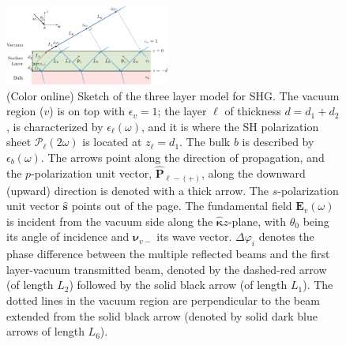 \documentclass[aps,prb,10pt,showpacs,letterpaper,twocolumn]{revtex4-1}
\begin{document}
\begin{figure}[t]
\centering 
\includegraphics[width=0.48\textwidth]{fig1}
\caption{(Color online) Sketch of the three layer model for SHG. The vacuum
region ($v$) is on top with $\epsilon_{v}=1$; the layer $\ell$ of thickness $d =
d_{1} + d_{2}$, is characterized by $\epsilon_{\ell}(\omega)$, and it is where
the SH polarization sheet $\boldsymbol{\mathcal{P}}_{\ell}(2\omega)$ is located
at $z_{\ell} = d_{1}$. The bulk $b$ is described by $\epsilon_{b}(\omega)$. The
arrows point along the direction of propagation, and the $p$-polarization unit
vector, $\hat{\mathbf{P}}_{\ell -(+)}$, along the downward (upward) direction is
denoted with a thick arrow. The $s$-polarization unit vector $\hat{\mathbf{s}}$
points out of the page. The fundamental field $\mathbf{E}_v(\omega)$ is incident
from the vacuum side along the $\hat{\boldsymbol{\kappa}}z$-plane, with
$\theta_{0}$ being its angle of incidence and $\boldsymbol{\nu}_{v-}$ its wave
vector. $\Delta\varphi_{i}$ denotes the phase difference between the multiple
reflected beams and the first layer-vacuum transmitted beam, denoted by the
dashed-red arrow (of length $L_{2}$) followed by the solid black arrow (of
length $L_{1}$). The dotted lines in the vacuum region are perpendicular to the
beam extended from the solid black arrow (denoted by solid dark blue arrows of
length $L_{6}$).}
\label{fig:MR3layer2w}
\end{figure}
\end{document}
